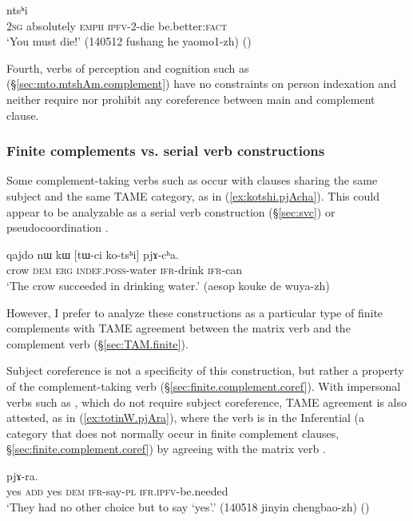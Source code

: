  \begin{exe}
\ex \label{ex:pjWtWsi.ntshi}
  ntsʰi\\
 \textsc{2sg} absolutely \textsc{emph} \textsc{ipfv}-2-die be.better:\textsc{fact} \\
 \glt `You must die!' (140512 fushang he yaomo1-zh)
()
 \end{exe} 
 
 Fourth, verbs of perception and cognition such as  (§\ref{sec:mto.mtshAm.complement}) have no constraints on person indexation and neither require nor prohibit any coreference between main and complement clause.

\subsubsection{Finite complements vs. serial verb constructions} \label{sec:svc.finite.agreement}
Some complement-taking verbs such as  occur with clauses sharing the same subject and the same TAME category, as in (\ref{ex:kotshi.pjAcha}). This could appear to be analyzable as a serial verb construction (§\ref{sec:svc}) or pseudocoordination \citep{loedrup14agree}.

\begin{exe}
\ex   \label{ex:kotshi.pjAcha}
\gll qajdo nɯ kɯ [tɯ-ci ko-tsʰi] pjɤ-cʰa. \\
crow \textsc{dem} \textsc{erg} \textsc{indef}.\textsc{poss}-water \textsc{ifr}-drink \textsc{ifr}-can \\
\glt `The crow succeeded in drinking water.' (aesop kouke de wuya-zh)
\end{exe}

However, I prefer to analyze these constructions as a particular type of finite complements with TAME agreement between the matrix verb and the complement verb (§\ref{sec:TAM.finite}). 

Subject coreference is not a specificity of this construction, but rather a property of the complement-taking verb (§\ref{sec:finite.complement.coref}). With impersonal verbs such as , which do not require subject coreference, TAME agreement is also attested, as in (\ref{ex:totinW.pjAra}), where the verb  is in the Inferential (a category that does not normally occur in finite complement clauses, §\ref{sec:finite.complement.coref}) by agreeing with the matrix verb . 

\begin{exe}
\ex   \label{ex:totinW.pjAra}
\gll [``ɣa" nɤ ``ɣa" nɯ to-ti-nɯ] pjɤ-ra. \\
yes \textsc{add} yes \textsc{dem} \textsc{ifr}-say-\textsc{pl} \textsc{ifr}.\textsc{ipfv}-be.needed \\
\glt `They had no other choice but to say `yes'.' (140518 jinyin chengbao-zh)
()
\end{exe}

